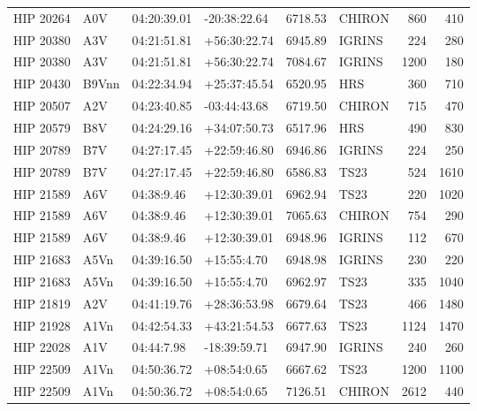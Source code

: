 \documentclass{emulateapj}
\begin{document}
\begin{longtable*}{|l|lllrlrr|}
   HIP 20264 &            A0V &    04:20:39.01 &   -20:38:22.64 &  6718.53 &     CHIRON &      860 &     410 \\
   HIP 20380 &            A3V &    04:21:51.81 &   +56:30:22.74 &  6945.89 &     IGRINS &      224 &     280 \\
   HIP 20380 &            A3V &    04:21:51.81 &   +56:30:22.74 &  7084.67 &     IGRINS &     1200 &     180 \\
   HIP 20430 &          B9Vnn &    04:22:34.94 &   +25:37:45.54 &  6520.95 &        HRS &      360 &     710 \\
   HIP 20507 &            A2V &    04:23:40.85 &   -03:44:43.68 &  6719.50 &     CHIRON &      715 &     470 \\
   HIP 20579 &            B8V &    04:24:29.16 &   +34:07:50.73 &  6517.96 &        HRS &      490 &     830 \\
   HIP 20789 &            B7V &    04:27:17.45 &   +22:59:46.80 &  6946.86 &     IGRINS &      224 &     250 \\
   HIP 20789 &            B7V &    04:27:17.45 &   +22:59:46.80 &  6586.83 &       TS23 &      524 &    1610 \\
   HIP 21589 &            A6V &     04:38:9.46 &   +12:30:39.01 &  6962.94 &       TS23 &      220 &    1020 \\
   HIP 21589 &            A6V &     04:38:9.46 &   +12:30:39.01 &  7065.63 &     CHIRON &      754 &     290 \\
   HIP 21589 &            A6V &     04:38:9.46 &   +12:30:39.01 &  6948.96 &     IGRINS &      112 &     670 \\
   HIP 21683 &           A5Vn &    04:39:16.50 &    +15:55:4.70 &  6948.98 &     IGRINS &      230 &     220 \\
   HIP 21683 &           A5Vn &    04:39:16.50 &    +15:55:4.70 &  6962.97 &       TS23 &      335 &    1040 \\
   HIP 21819 &            A2V &    04:41:19.76 &   +28:36:53.98 &  6679.64 &       TS23 &      466 &    1480 \\
   HIP 21928 &           A1Vn &    04:42:54.33 &   +43:21:54.53 &  6677.63 &       TS23 &     1124 &    1470 \\
   HIP 22028 &            A1V &     04:44:7.98 &   -18:39:59.71 &  6947.90 &     IGRINS &      240 &     260 \\
   HIP 22509 &           A1Vn &    04:50:36.72 &    +08:54:0.65 &  6667.62 &       TS23 &     1200 &    1100 \\
   HIP 22509 &           A1Vn &    04:50:36.72 &    +08:54:0.65 &  7126.51 &     CHIRON &     2612 &     440 \\

\end{longtable*}
\end{document}
